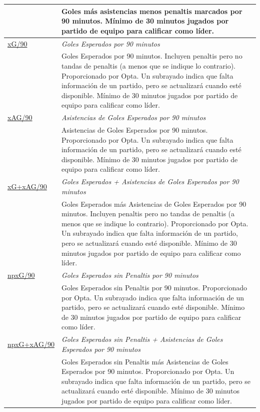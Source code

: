 \documentclass[a4paper,11pt]{article}
\theoremstyle{definition}
\begin{document}
\begin{longtable}{|l|p{12cm}|}
        & Goles más asistencias menos penaltis marcados por 90 minutos. Mínimo de 30 minutos jugados por partido de equipo para calificar como líder. \\
        \hline
        \hyperlink{tooltip:xG}{xG/90} & \textit{Goles Esperados por 90 minutos} \\
        & Goles Esperados por 90 minutos. Incluyen penaltis pero no tandas de penaltis (a menos que se indique lo contrario). Proporcionado por Opta. Un subrayado indica que falta información de un partido, pero se actualizará cuando esté disponible. Mínimo de 30 minutos jugados por partido de equipo para calificar como líder. \\
        \hline
        \hyperlink{tooltip:xAG}{xAG/90} & \textit{Asistencias de Goles Esperados por 90 minutos} \\
        & Asistencias de Goles Esperados por 90 minutos. Proporcionado por Opta. Un subrayado indica que falta información de un partido, pero se actualizará cuando esté disponible. Mínimo de 30 minutos jugados por partido de equipo para calificar como líder. \\
        \hline
        \hyperlink{tooltip:xG+xAG}{xG+xAG/90} & \textit{Goles Esperados + Asistencias de Goles Esperados por 90 minutos} \\
        & Goles Esperados más Asistencias de Goles Esperados por 90 minutos. Incluyen penaltis pero no tandas de penaltis (a menos que se indique lo contrario). Proporcionado por Opta. Un subrayado indica que falta información de un partido, pero se actualizará cuando esté disponible. Mínimo de 30 minutos jugados por partido de equipo para calificar como líder. \\
        \hline
        \hyperlink{tooltip:npxG}{npxG/90} & \textit{Goles Esperados sin Penaltis por 90 minutos} \\
        & Goles Esperados sin Penaltis por 90 minutos. Proporcionado por Opta. Un subrayado indica que falta información de un partido, pero se actualizará cuando esté disponible. Mínimo de 30 minutos jugados por partido de equipo para calificar como líder. \\
        \hline
        \hyperlink{tooltip:npxG+xAG}{npxG+xAG/90} & \textit{Goles Esperados sin Penaltis + Asistencias de Goles Esperados por 90 minutos} \\
        & Goles Esperados sin Penaltis más Asistencias de Goles Esperados por 90 minutos. Proporcionado por Opta. Un subrayado indica que falta información de un partido, pero se actualizará cuando esté disponible. Mínimo de 30 minutos jugados por partido de equipo para calificar como líder. \\
        \hline
    \end{longtable}
\end{document}
